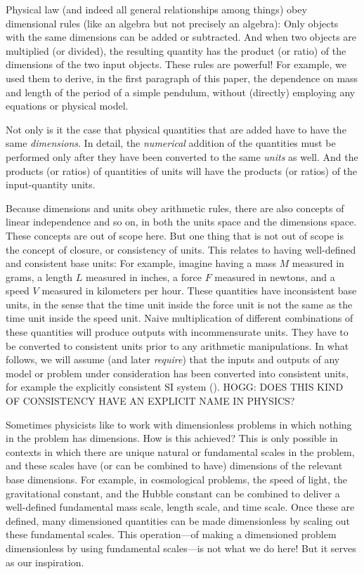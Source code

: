 \documentclass[12pt, letterpaper]{article}
\begin{document}
Physical law (and indeed all general relationships among things) obey dimensional rules (like an algebra but not precisely an algebra):
Only objects with the same dimensions can be added or subtracted.
And when two objects are multiplied (or divided), the resulting quantity has the product (or ratio) of the dimensions of the two input objects.
These rules are powerful!
For example, we used them to derive, in the first paragraph of this paper, the dependence on mass and length of the period of a simple pendulum, without (directly) employing any equations or physical model.

Not only is it the case that physical quantities that are added have to have the same \emph{dimensions}.
In detail, the \emph{numerical} addition of the quantities must be performed only after they have been converted to the same \emph{units} as well.
And the products (or ratios) of quantities of units will have the products (or ratios) of the input-quantity units.

Because dimensions and units obey arithmetic rules, there are also concepts of linear independence and so on, in both the units space and the dimensions space.
These concepts are out of scope here.
But one thing that is not out of scope is the concept of closure, or consistency of units.
This relates to having well-defined and consistent base units:
For example, imagine having a mass $M$ measured in grams, a length $L$ measured in inches, a force $F$ measured in newtons, and a speed $V$ measured in kilometers per hour. These quantities have inconsistent base units, in the sense that the time unit inside the force unit is not the same as the time unit inside the speed unit.
Naive multiplication of different combinations of these quantities will produce outputs with incommensurate units.
They have to be converted to consistent units prior to any arithmetic manipulations.
In what follows, we will assume (and later \emph{require}) that the inputs and outputs of any model or problem under consideration has been converted into consistent units, for example the explicitly consistent SI system (\cite{si}).
HOGG: DOES THIS KIND OF CONSISTENCY HAVE AN EXPLICIT NAME IN PHYSICS?

Sometimes physicists like to work with dimensionless problems in which nothing in the problem has dimensions.
How is this achieved?
This is only possible in contexts in which there are unique natural or fundamental scales in the problem, and these scales have (or can be combined to have) dimensions of the relevant base dimensions.
For example, in cosmological problems, the speed of light, the gravitational constant, and the Hubble constant can be combined to deliver a well-defined fundamental mass scale, length scale, and time scale.
Once these are defined, many dimensioned quantities can be made dimensionless by scaling out these fundamental scales.
This operation---of making a dimensioned problem dimensionless by using fundamental scales---is not what we do here!
But it serves as our inspiration.
\end{document}
